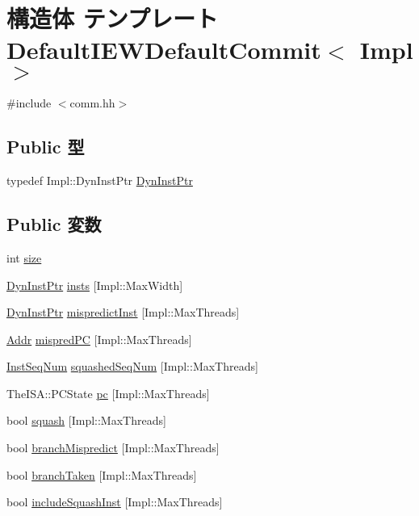 \hypertarget{structDefaultIEWDefaultCommit}{
\section{構造体 テンプレート DefaultIEWDefaultCommit$<$ Impl $>$}
\label{structDefaultIEWDefaultCommit}
}


{\ttfamily \#include $<$comm.hh$>$}\subsection*{Public 型}
\begin{DoxyCompactItemize}
\item 
typedef Impl::DynInstPtr \hyperlink{structDefaultIEWDefaultCommit_a028ce10889c5f6450239d9e9a7347976}{DynInstPtr}
\end{DoxyCompactItemize}
\subsection*{Public 変数}
\begin{DoxyCompactItemize}
\item 
int \hyperlink{structDefaultIEWDefaultCommit_a439227feff9d7f55384e8780cfc2eb82}{size}
\item 
\hyperlink{structDefaultIEWDefaultCommit_a028ce10889c5f6450239d9e9a7347976}{DynInstPtr} \hyperlink{structDefaultIEWDefaultCommit_a84958be72c3a0ec66109a9483e6c0331}{insts} \mbox{[}Impl::MaxWidth\mbox{]}
\item 
\hyperlink{structDefaultIEWDefaultCommit_a028ce10889c5f6450239d9e9a7347976}{DynInstPtr} \hyperlink{structDefaultIEWDefaultCommit_a39a39d0373d22fba851125f24097756f}{mispredictInst} \mbox{[}Impl::MaxThreads\mbox{]}
\item 
\hyperlink{base_2types_8hh_af1bb03d6a4ee096394a6749f0a169232}{Addr} \hyperlink{structDefaultIEWDefaultCommit_a3fee36ecd6e2d8a9bb2b85f59c7d3882}{mispredPC} \mbox{[}Impl::MaxThreads\mbox{]}
\item 
\hyperlink{inst__seq_8hh_a258d93d98edaedee089435c19ea2ea2e}{InstSeqNum} \hyperlink{structDefaultIEWDefaultCommit_a97d5a7e4630ad1d017909f7504b9ec32}{squashedSeqNum} \mbox{[}Impl::MaxThreads\mbox{]}
\item 
TheISA::PCState \hyperlink{structDefaultIEWDefaultCommit_a6e6091c9272a281b8693c0f46279cad0}{pc} \mbox{[}Impl::MaxThreads\mbox{]}
\item 
bool \hyperlink{structDefaultIEWDefaultCommit_a1ecc4947f538d6f0777049675b1d4dbc}{squash} \mbox{[}Impl::MaxThreads\mbox{]}
\item 
bool \hyperlink{structDefaultIEWDefaultCommit_ad250d56453906f1c145342ad4c930612}{branchMispredict} \mbox{[}Impl::MaxThreads\mbox{]}
\item 
bool \hyperlink{structDefaultIEWDefaultCommit_a8f87121d9af02a522e3bfdbfafe500a2}{branchTaken} \mbox{[}Impl::MaxThreads\mbox{]}
\item 
bool \hyperlink{structDefaultIEWDefaultCommit_a4e52109fe1d9517fec57f3e5ac5c0905}{includeSquashInst} \mbox{[}Impl::MaxThreads\mbox{]}
\end{DoxyCompactItemize}


